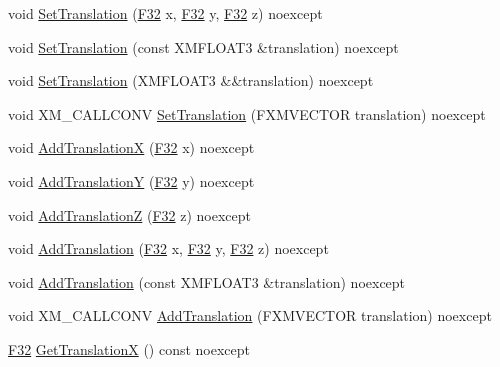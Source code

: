 \begin{DoxyCompactItemize}
\item 
void \hyperlink{classmage_1_1_transform_afb794877f9b538b5ce4b55e4cd8852f0}{Set\+Translation} (\hyperlink{namespacemage_aa97e833b45f06d60a0a9c4fc22ae02c0}{F32} x, \hyperlink{namespacemage_aa97e833b45f06d60a0a9c4fc22ae02c0}{F32} y, \hyperlink{namespacemage_aa97e833b45f06d60a0a9c4fc22ae02c0}{F32} z) noexcept
\item 
void \hyperlink{classmage_1_1_transform_aa20a954eea7d0ae56978cb8945d94d60}{Set\+Translation} (const X\+M\+F\+L\+O\+A\+T3 \&translation) noexcept
\item 
void \hyperlink{classmage_1_1_transform_a929668342773398898fa76449da83583}{Set\+Translation} (X\+M\+F\+L\+O\+A\+T3 \&\&translation) noexcept
\item 
void X\+M\+\_\+\+C\+A\+L\+L\+C\+O\+NV \hyperlink{classmage_1_1_transform_a0c93ec5483091d4be508e11d5c05579e}{Set\+Translation} (F\+X\+M\+V\+E\+C\+T\+OR translation) noexcept
\item 
void \hyperlink{classmage_1_1_transform_a1161f8c965e071dd59f1780d7a06952b}{Add\+TranslationX} (\hyperlink{namespacemage_aa97e833b45f06d60a0a9c4fc22ae02c0}{F32} x) noexcept
\item 
void \hyperlink{classmage_1_1_transform_abf9253ddafad2725ef6c6e2b4bd44b35}{Add\+TranslationY} (\hyperlink{namespacemage_aa97e833b45f06d60a0a9c4fc22ae02c0}{F32} y) noexcept
\item 
void \hyperlink{classmage_1_1_transform_a2554a3af167bb8ae9f4724921e6a3596}{Add\+TranslationZ} (\hyperlink{namespacemage_aa97e833b45f06d60a0a9c4fc22ae02c0}{F32} z) noexcept
\item 
void \hyperlink{classmage_1_1_transform_ae786c4135de007be509b5d5fe9d1a60b}{Add\+Translation} (\hyperlink{namespacemage_aa97e833b45f06d60a0a9c4fc22ae02c0}{F32} x, \hyperlink{namespacemage_aa97e833b45f06d60a0a9c4fc22ae02c0}{F32} y, \hyperlink{namespacemage_aa97e833b45f06d60a0a9c4fc22ae02c0}{F32} z) noexcept
\item 
void \hyperlink{classmage_1_1_transform_a32736bfdab941254501ee9a4cc7fdb0e}{Add\+Translation} (const X\+M\+F\+L\+O\+A\+T3 \&translation) noexcept
\item 
void X\+M\+\_\+\+C\+A\+L\+L\+C\+O\+NV \hyperlink{classmage_1_1_transform_a931911a2ef61b9a74be444e4c65ee46a}{Add\+Translation} (F\+X\+M\+V\+E\+C\+T\+OR translation) noexcept
\item 
\hyperlink{namespacemage_aa97e833b45f06d60a0a9c4fc22ae02c0}{F32} \hyperlink{classmage_1_1_transform_a90b2c059a45964bf4de816a4b7e6c55c}{Get\+TranslationX} () const noexcept
\item 

\end{DoxyCompactItemize}
